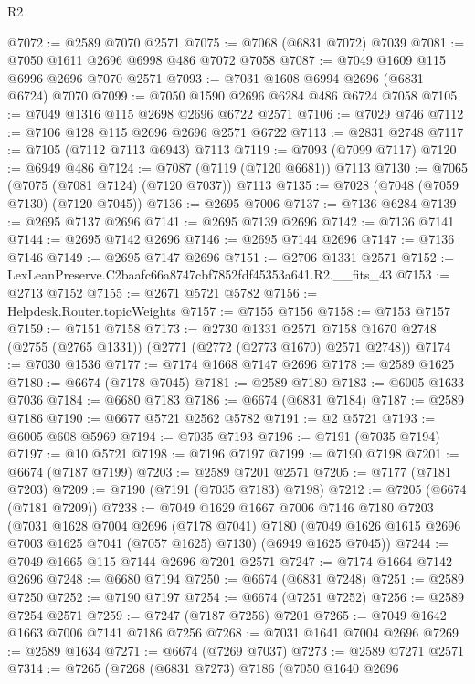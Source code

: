 \begin{lexlean}{R2}
\begin{coremodule}
@7072 := @2589 @7070 @2571
@7075 := @7068 (@6831 @7072) @7039
@7081 := @7050 @1611 @2696 @6998 @486 @7072 @7058
@7087 := @7049 @1609 @115 @6996 @2696 @7070 @2571
@7093 := @7031 @1608 @6994 @2696 (@6831 @6724) @7070
@7099 := @7050 @1590 @2696 @6284 @486 @6724 @7058
@7105 := @7049 @1316 @115 @2698 @2696 @6722 @2571
@7106 := @7029 @746
@7112 := @7106 @128 @115 @2696 @2696 @2571 @6722
@7113 := @2831 @2748
@7117 := @7105 (@7112 @7113 @6943) @7113
@7119 := @7093 (@7099 @7117)
@7120 := @6949 @486
@7124 := @7087 (@7119 (@7120 @6681)) @7113
@7130 := @7065 (@7075 (@7081 @7124) (@7120 @7037)) @7113
@7135 := @7028 (@7048 (@7059 @7130) (@7120 @7045))
@7136 := @2695 @7006
@7137 := @7136 @6284
@7139 := @2695 @7137 @2696
@7141 := @2695 @7139 @2696
@7142 := @7136 @7141
@7144 := @2695 @7142 @2696
@7146 := @2695 @7144 @2696
@7147 := @7136 @7146
@7149 := @2695 @7147 @2696
@7151 := @2706 @1331 @2571
@7152 := LexLeanPreserve.C2baafc66a8747cbf7852fdf45353a641.R2.__fits_43
@7153 := @2713 @7152
@7155 := @2671 @5721 @5782
@7156 := Helpdesk.Router.topicWeights
@7157 := @7155 @7156
@7158 := @7153 @7157
@7159 := @7151 @7158
@7173 := @2730
    @1331
    @2571
    @7158
    @1670
    @2748
    (@2755 (@2765 @1331))
    (@2771 (@2772 (@2773 @1670) @2571 @2748))
@7174 := @7030 @1536
@7177 := @7174 @1668 @7147 @2696
@7178 := @2589 @1625
@7180 := @6674 (@7178 @7045)
@7181 := @2589 @7180
@7183 := @6005 @1633 @7036
@7184 := @6680 @7183
@7186 := @6674 (@6831 @7184)
@7187 := @2589 @7186
@7190 := @6677 @5721 @2562 @5782
@7191 := @2 @5721
@7193 := @6005 @608 @5969
@7194 := @7035 @7193
@7196 := @7191 (@7035 @7194)
@7197 := @10 @5721
@7198 := @7196 @7197
@7199 := @7190 @7198
@7201 := @6674 (@7187 @7199)
@7203 := @2589 @7201 @2571
@7205 := @7177 (@7181 @7203)
@7209 := @7190 (@7191 (@7035 @7183) @7198)
@7212 := @7205 (@6674 (@7181 @7209))
@7238 := @7049
    @1629
    @1667
    @7006
    @7146
    @7180
    @7203
    (@7031
      @1628
      @7004
      @2696
      (@7178 @7041)
      @7180
      (@7049 @1626 @1615 @2696 @7003 @1625 @7041 (@7057 @1625) @7130)
      (@6949 @1625 @7045))
@7244 := @7049 @1665 @115 @7144 @2696 @7201 @2571
@7247 := @7174 @1664 @7142 @2696
@7248 := @6680 @7194
@7250 := @6674 (@6831 @7248)
@7251 := @2589 @7250
@7252 := @7190 @7197
@7254 := @6674 (@7251 @7252)
@7256 := @2589 @7254 @2571
@7259 := @7247 (@7187 @7256) @7201
@7265 := @7049 @1642 @1663 @7006 @7141 @7186 @7256
@7268 := @7031 @1641 @7004 @2696
@7269 := @2589 @1634
@7271 := @6674 (@7269 @7037)
@7273 := @2589 @7271 @2571
@7314 := @7265
    (@7268
      (@6831 @7273)
      @7186
      (@7050
        @1640
        @2696

\end{coremodule}
\end{lexlean}
